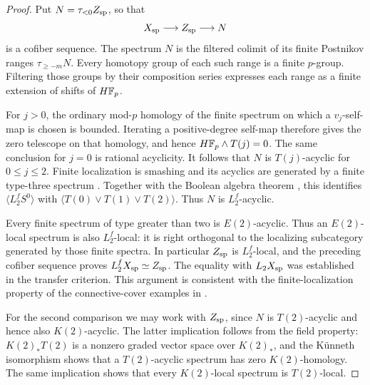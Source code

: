 \begin{proof}
Put \(N=\tau_{<0}Z_{\rm sp}\), so that
\[
 X_{\rm sp}\longrightarrow Z_{\rm sp}\longrightarrow N
\]
is a cofiber sequence.  The spectrum \(N\) is the filtered colimit of
its finite Postnikov ranges \(\tau_{\geq-m}N\).  Every homotopy group
of each such range is a finite \(p\)-group.  Filtering those groups by
their composition series expresses each range as a finite extension of
shifts of \(H\mathbb F_p\).

For \(j>0\), the ordinary mod-\(p\) homology of the finite spectrum
on which a \(v_j\)-self-map is chosen is bounded.  Iterating a
positive-degree self-map therefore gives the zero telescope on that
homology, and hence
\(H\mathbb F_p\wedge T(j)=0\).  The same conclusion for \(j=0\) is rational
acyclicity.  It follows that \(N\) is \(T(j)\)-acyclic for
\(0\leq j\leq2\).  Finite localization is smashing and its acyclics
are generated by a finite type-three spectrum
\cite[author-preprint Corollary~1.19(i) and Theorem~2.7(ii)]{Ravenel1993}.
Together with the Boolean algebra theorem
\cite[Theorem~7.2.9]{Ravenel1992}, this identifies
\(\langle L_2^fS^0\rangle\) with
\(\langle T(0)\vee T(1)\vee T(2)\rangle\).
Thus \(N\) is \(L_2^f\)-acyclic.

Every finite spectrum of type greater than two is \(E(2)\)-acyclic.
Thus an \(E(2)\)-local spectrum is also \(L_2^f\)-local: it is right
orthogonal to the localizing subcategory generated by those finite
spectra.  In particular \(Z_{\rm sp}\) is \(L_2^f\)-local, and the
preceding cofiber sequence proves
\(L_2^fX_{\rm sp}\simeq Z_{\rm sp}\).  The equality with
\(L_2X_{\rm sp}\) was established in the transfer criterion.  This
argument is consistent with the finite-localization property of the
connective-cover examples in \cite[Section~7.2(2)]{MR1999}.

For the second comparison we may work with \(Z_{\rm sp}\), since
\(N\) is \(T(2)\)-acyclic and hence also \(K(2)\)-acyclic.  The
latter implication follows from the field property: \(K(2)_*T(2)\)
is a nonzero graded vector space over \(K(2)_*\), and the K\"unneth
isomorphism shows that a \(T(2)\)-acyclic spectrum has zero
\(K(2)\)-homology.  The same implication shows that every
\(K(2)\)-local spectrum is \(T(2)\)-local.


\end{proof}
